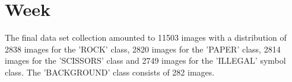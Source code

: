 \chapter{Week}
The final data set collection amounted to 11503 images with a distribution of 2838 images for the 'ROCK' class, 2820 images for the 'PAPER' class, 2814 images for the 'SCISSORS' class and 2749 images for the 'ILLEGAL' symbol class. The 'BACKGROUND' class consists of 282 images.